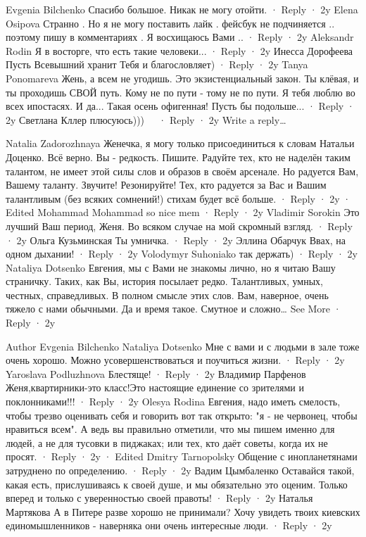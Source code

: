  
 
 
 
 
Evgenia Bilchenko
Спасибо большое. Никак не могу отойти.
 · Reply · 2y
Elena Osipova
Странно . Но я не могу поставить лайк . фейсбук не подчиняется .. поэтому пишу в комментариях . Я восхищаюсь Вами ..
 · Reply · 2y
Aleksandr Rodin
Я в восторге, что есть такие человеки...
 · Reply · 2y
Инесса Дорофеева
Пусть Всевышний хранит Тебя и благословляет)
 · Reply · 2y
Tanya Ponomareva
Жень, а всем не угодишь. Это экзистенциальный закон. Ты клёвая, и ты проходишь СВОЙ путь. Кому не по пути - тому не по пути. Я тебя люблю во всех ипостасях. И да... Такая осень офигенная! Пусть бы подольше...
 · Reply · 2y
Светлана Кллер
плюсуюсь)))🍁🍁🍁🍁
 · Reply · 2y
Write a reply…

Natalia Zadorozhnaya
Женечка, я могу только присоединиться к словам Натальи Доценко. Всё верно. Вы - редкость. Пишите. Радуйте тех, кто не наделён таким талантом, не имеет этой силы слов и образов в своём арсенале. Но радуется Вам, Вашему таланту. Звучите! Резонируйте! Тех, кто радуется за Вас и Вашим талантливым (без всяких сомнений!) стихам будет всё больше.
 · Reply · 2y · Edited
Mohammad Mohammad
so nice mem
 · Reply · 2y
Vladimir Sorokin
Это лучший Ваш период, Женя. Во всяком случае на мой скромный взгляд.
 · Reply · 2y
Ольга Кузьминская
Ты умничка.
 · Reply · 2y
Эллина Обарчук
Ввах, на одном дыхании!
 · Reply · 2y
Volodymyr Suhoniako
так держать)
 · Reply · 2y
Nataliya Dotsenko
Евгения, мы с Вами не знакомы лично, но я читаю Вашу страничку. Таких, как Вы, история посылает редко. Талантливых, умных, честных, справедливых. В полном смысле этих слов. Вам, наверное, очень тяжело с нами обычными. Да и время такое. Смутное и сложно… See More
 · Reply · 2y

Author
Evgenia Bilchenko
Nataliya Dotsenko Мне с вами и с людьми в зале тоже очень хорошо. Можно усовершенствоваться и поучиться жизни.
 · Reply · 2y
Yaroslava Podluzhnova
Блестяще!
 · Reply · 2y
Владимир Парфенов
Женя,квартирники-это класс!Это настоящие единение со зрителями и поклонниками!!!
 · Reply · 2y
Olesya Rodina
Евгения, надо иметь смелость, чтобы трезво оценивать себя и говорить вот так открыто: "я - не червонец, чтобы нравиться всем". А ведь вы правильно отметили, что мы пишем именно для людей, а не для тусовки в пиджаках; или тех, кто даёт советы, когда их не просят.
 · Reply · 2y · Edited
Dmitry Tarnopolsky
Общение с инопланетянами затруднено по определению.
 · Reply · 2y
Вадим Цымбаленко
Оставайся такой, какая есть, прислушиваясь к своей душе, и мы обязательно это оценим. Только вперед и только с уверенностью своей правоты!
 · Reply · 2y
Наталья Мартякова
А в Питере разве хорошо не принимали?
Хочу увидеть твоих киевских единомышленников - наверняка они очень интересные люди.
 · Reply · 2y
